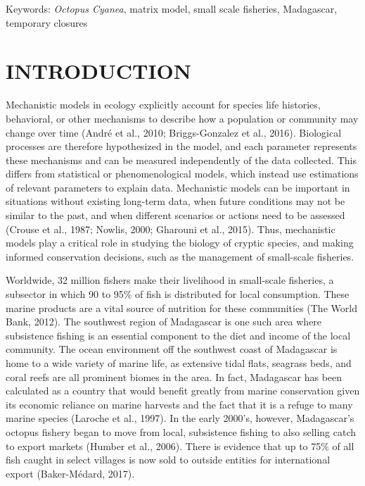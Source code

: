 \documentclass[
]{article}
\begin{document}
Keywords: \emph{Octopus Cyanea}, matrix model, small scale fisheries, Madagascar, temporary closures

\hypertarget{introduction}{%
\section{INTRODUCTION}\label{introduction}}

Mechanistic models in ecology explicitly account for species life histories, behavioral, or other mechanisms to describe how a population or community may change over time (André et al., 2010; Briggs-Gonzalez et al., 2016). Biological processes are therefore hypothesized in the model, and each parameter represents these mechanisms and can be measured independently of the data collected. This differs from statistical or phenomenological models, which instead use estimations of relevant parameters to explain data. Mechanistic models can be important in situations without existing long-term data, when future conditions may not be similar to the past, and when different scenarios or actions need to be assessed (Crouse et al., 1987; Nowlis, 2000; Gharouni et al., 2015). Thus, mechanistic models play a critical role in studying the biology of cryptic species, and making informed conservation decisions, such as the management of small-scale fisheries.

Worldwide, 32 million fishers make their livelihood in small-scale fisheries, a subsector in which 90 to 95\% of fish is distributed for local consumption. These marine products are a vital source of nutrition for these communities (The World Bank, 2012). The southwest region of Madagascar is one such area where subsistence fishing is an essential component to the diet and income of the local community. The ocean environment off the southwest coast of Madagascar is home to a wide variety of marine life, as extensive tidal flats, seagrass beds, and coral reefs are all prominent biomes in the area. In fact, Madagascar has been calculated as a country that would benefit greatly from marine conservation given its economic reliance on marine harvests and the fact that it is a refuge to many marine species (Laroche et al., 1997). In the early 2000's, however, Madagascar's octopus fishery began to move from local, subsistence fishing to also selling catch to export markets (Humber et al., 2006). There is evidence that up to 75\% of all fish caught in select villages is now sold to outside entities for international export (Baker-Médard, 2017).
\end{document}
